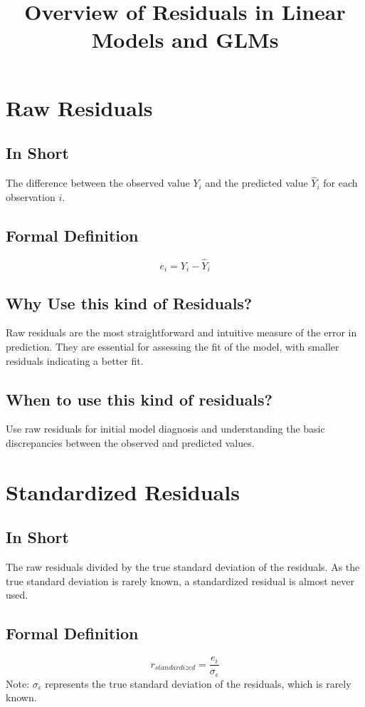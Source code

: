 \documentclass{article}
\begin{document}
\title{Overview of Residuals in Linear Models and GLMs}
\maketitle
\section{Raw Residuals}
\subsection{In Short}
The difference between the observed value \(Y_i\) and the predicted value \(\hat{Y}_i\) for each observation \(i\).

\subsection{Formal Definition}
\[ e_i = Y_i - \hat{Y}_i \]

\subsection{Why Use this kind of Residuals?}
Raw residuals are the most straightforward and intuitive measure of the error in prediction. They are essential for assessing the fit of the model, with smaller residuals indicating a better fit.

\subsection{When to use this kind of residuals?}
Use raw residuals for initial model diagnosis and understanding the basic discrepancies between the observed and predicted values.

\section{Standardized Residuals}
\subsection{In Short}
The raw residuals divided by the true standard deviation of the residuals. As the true standard deviation is rarely known, a standardized residual is almost never used.

\subsection{Formal Definition}
\[ r_{standardized} = \frac{e_i}{\sigma_{\epsilon}} \]
Note: \(\sigma_{\epsilon}\) represents the true standard deviation of the residuals, which is rarely known.
\end{document}
